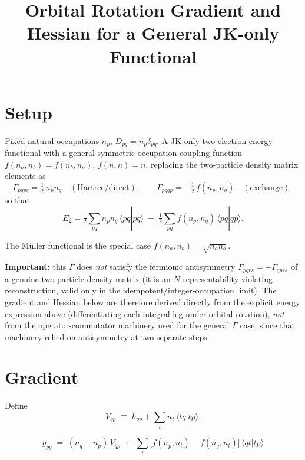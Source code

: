 \documentclass[11pt]{article}
\title{Orbital Rotation Gradient and Hessian for a General JK-only Functional}
\author{}
\date{}
\begin{document}
\maketitle

\section*{Setup}

Fixed natural occupations $n_p$, $D_{pq}=n_p\delta_{pq}$. A JK-only two-electron
energy functional with a general symmetric occupation-coupling function
$f(n_a,n_b)=f(n_b,n_a)$, $f(n,n)=n$, replacing the two-particle density matrix
elements as
\begin{equation}
\Gamma_{pqpq} = \tfrac12\,n_p n_q \quad (\text{Hartree/direct}), \qquad
\Gamma_{pqqp} = -\tfrac12\,f(n_p,n_q) \quad (\text{exchange}),
\end{equation}
so that
\begin{equation}
E_2 = \tfrac12\sum_{pq} n_p n_q\,\langle pq|pq\rangle
\;-\; \tfrac12\sum_{pq} f(n_p,n_q)\,\langle pq|qp\rangle .
\end{equation}

The M\"uller functional is the special case $f(n_a,n_b)=\sqrt{n_a n_b}$.

\bigskip
\noindent\textbf{Important:} this $\Gamma$ does \emph{not} satisfy the
fermionic antisymmetry $\Gamma_{pqrs}=-\Gamma_{qprs}$ of a genuine two-particle
density matrix (it is an $N$-representability-violating reconstruction, valid
only in the idempotent/integer-occupation limit). The gradient and Hessian
below are therefore derived directly from the explicit energy expression
above (differentiating each integral leg under orbital rotation), \emph{not}
from the operator-commutator machinery used for the general $\Gamma$ case,
since that machinery relied on antisymmetry at two separate steps.

\section*{Gradient}

Define
\begin{equation}
V_{qp} \;\equiv\; h_{qp} + \sum_t n_t\,\langle tq|tp\rangle .
\end{equation}

\begin{equation}
\boxed{\,
g_{pq} \;=\; (n_q-n_p)\,V_{qp}
\;+\; \sum_t \big[f(n_p,n_t)-f(n_q,n_t)\big]\,\langle qt|tp\rangle
\,}
\end{equation}
\end{document}
